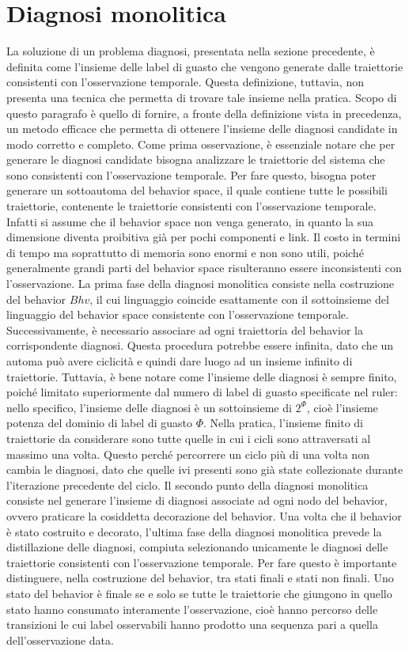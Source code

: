 \section{Diagnosi monolitica}
La soluzione di un problema diagnosi, presentata nella sezione precedente, è definita come l'insieme delle label di guasto che vengono generate dalle traiettorie consistenti con l'osservazione temporale. Questa definizione, tuttavia, non presenta una tecnica che permetta di trovare tale insieme nella pratica. Scopo di questo paragrafo è quello di fornire, a fronte della definizione vista in precedenza, un metodo efficace che permetta di ottenere l'insieme delle diagnosi candidate in modo corretto e completo. 
Come prima osservazione, è essenziale notare che per generare le diagnosi candidate bisogna analizzare le traiettorie del sistema che sono consistenti con l'osservazione temporale. Per fare questo, bisogna poter generare un sottoautoma del behavior space, il quale contiene tutte le possibili traiettorie, contenente le traiettorie consistenti con l'osservazione temporale. Infatti si assume che il behavior space non venga generato, in quanto la sua dimensione diventa proibitiva già per pochi componenti e link. Il costo in termini di tempo ma soprattutto di memoria sono enormi e non sono utili, poiché generalmente grandi parti del behavior space risulteranno essere inconsistenti con l'osservazione.
La prima fase della diagnosi monolitica consiste nella costruzione del behavior $Bhv$, il cui linguaggio coincide esattamente con il sottoinsieme del linguaggio del behavior space consistente con l'osservazione temporale. Successivamente, è necessario associare ad ogni traiettoria del behavior la corrispondente diagnosi. Questa procedura potrebbe essere infinita, dato che un automa può avere ciclicità e quindi dare luogo ad un insieme infinito di traiettorie. Tuttavia, è bene notare come l'insieme delle diagnosi è sempre finito, poiché limitato superiormente dal numero di label di guasto specificate nel ruler: nello specifico, l'insieme delle diagnosi è un sottoinsieme di $2^\Phi$, cioè l'insieme potenza del dominio di label di guasto $\Phi$. Nella pratica, l'insieme finito di traiettorie da considerare sono tutte quelle in cui i cicli sono attraversati al massimo una volta. Questo perché percorrere un ciclo più di una volta non cambia le diagnosi, dato che quelle ivi presenti sono già state collezionate durante l'iterazione precedente del ciclo.
Il secondo punto della diagnosi monolitica consiste nel generare l'insieme di diagnosi associate ad ogni nodo del behavior, ovvero praticare la cosiddetta decorazione del behavior.
Una volta che il behavior è stato costruito e decorato, l'ultima fase della diagnosi monolitica prevede la distillazione delle diagnosi, compiuta selezionando unicamente le diagnosi delle traiettorie consistenti con l'osservazione temporale. Per fare questo è importante distinguere, nella costruzione del behavior, tra stati finali e stati non finali. Uno stato del behavior è finale se e solo se tutte le traiettorie che giungono in quello stato hanno consumato interamente l'osservazione, cioè hanno percorso delle transizioni le cui label osservabili hanno prodotto una sequenza pari a quella dell'osservazione data. 

